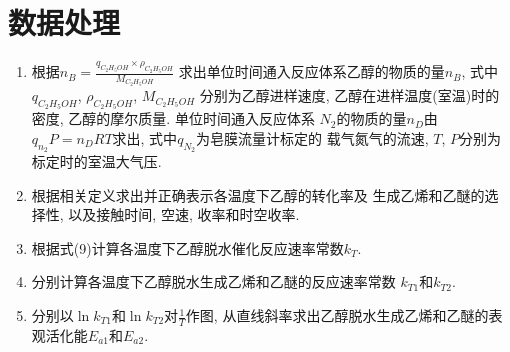 \documentclass[a4paper]{article}
\begin{document}
\section{数据处理}
\begin{enumerate}
\item 根据$n_{B} = \frac{q_{C_{2}H_{5}OH}\times \rho_{C_{2}H_{5}OH}}{M_{C_{2}H_{5}OH}}$
求出单位时间通入反应体系乙醇的物质的量$n_{B}$, 式中$q_{C_{2}H_{5}OH}$, $\rho_{C_{2}H_{5}OH}$, $M_{C_{2}H_{5}OH}$
分别为乙醇进样速度, 乙醇在进样温度(室温)时的密度, 乙醇的摩尔质量. 单位时间通入反应体系
$N_{2}$的物质的量$n_{D}$由$q_{n_{2}}P = n_{D}RT$求出, 式中$q_{N_{2}}$为皂膜流量计标定的
载气氮气的流速, $T$, $P$分别为标定时的室温大气压.
\item 根据相关定义求出并正确表示各温度下乙醇的转化率及
生成乙烯和乙醚的选择性, 以及接触时间, 空速, 收率和时空收率.
\item 根据式(9)计算各温度下乙醇脱水催化反应速率常数$k_{T}$.
\item 分别计算各温度下乙醇脱水生成乙烯和乙醚的反应速率常数
$k_{T1}$和$k_{T2}$.
\item 分别以$\ln k_{T1}$和$\ln k_{T2}$对$\frac{1}{T}$作图, 
从直线斜率求出乙醇脱水生成乙烯和乙醚的表观活化能$E_{a1}$和$E_{a2}$.


\end{enumerate}
\end{document}
